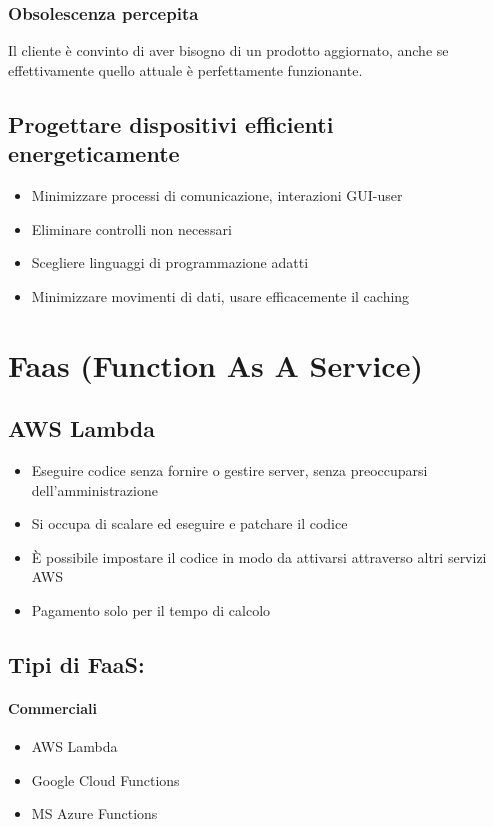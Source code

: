 \documentclass[a4paper, 12pt]{report}
\begin{document}
      \subsection{Obsolescenza percepita}
      Il cliente è convinto di aver bisogno di un prodotto aggiornato, anche se effettivamente quello attuale è perfettamente funzionante.
      \section{Progettare dispositivi efficienti energeticamente}
        \begin{itemize}
          \item Minimizzare processi di comunicazione, interazioni GUI-user
          \item Eliminare controlli non necessari
          \item Scegliere linguaggi di programmazione adatti
          \item Minimizzare movimenti di dati, usare efficacemente il caching
        \end{itemize}
    \chapter{Faas (Function As A Service)}
        \section{AWS Lambda}
          \begin{itemize}
            \item Eseguire codice senza fornire o gestire server, senza preoccuparsi dell'amministrazione
            \item Si occupa di scalare ed eseguire e patchare il codice
            \item È possibile impostare il codice in modo da attivarsi attraverso altri servizi AWS
            \item Pagamento solo per il tempo di calcolo
          \end{itemize}
        \clearpage
          \section{Tipi di FaaS:}
          \subsubsection{Commerciali}
          \begin{itemize}
            \item AWS Lambda
            \item Google Cloud Functions
            \item MS Azure Functions
          \end{itemize}
\end{document}
